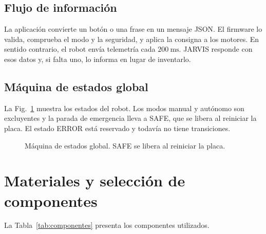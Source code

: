 \documentclass[journal]{IEEEtran}
\begin{document}
\subsection{Flujo de información}

La aplicación convierte un botón o una frase en un mensaje JSON. El firmware lo valida, comprueba el modo y la seguridad, y aplica la consigna a los motores. En sentido contrario, el robot envía telemetría cada $200~\mathrm{ms}$. JARVIS responde con esos datos y, si falta uno, lo informa en lugar de inventarlo.

\subsection{Máquina de estados global}

La Fig.~\ref{fig:fsm} muestra los estados del robot. Los modos manual y autónomo son excluyentes y la parada de emergencia lleva a SAFE, que se libera al reiniciar la placa. El estado ERROR está reservado y todavía no tiene transiciones.

\begin{figure}[H]
\centering
{}
\caption{Máquina de estados global. SAFE se libera al reiniciar la placa.}
\label{fig:fsm}
\end{figure}

\section{Materiales y selección de componentes}

La Tabla~\ref{tab:componentes} presenta los componentes utilizados.
\end{document}
